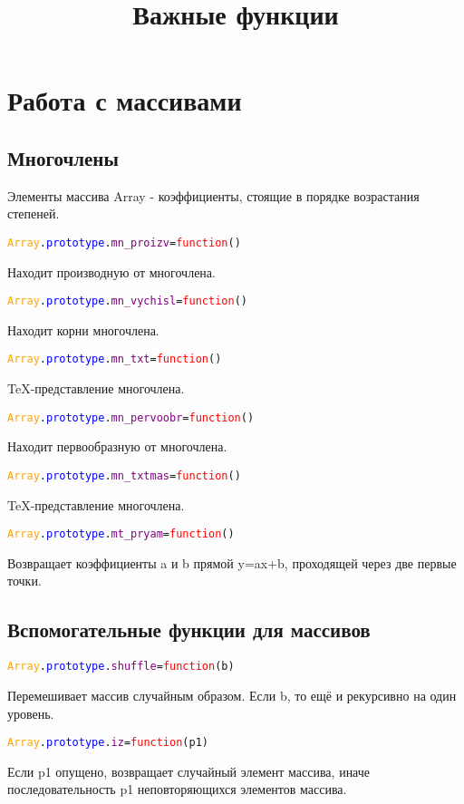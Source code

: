 \documentclass[a4paper,12pt]{article}
\begin{document}
	
	\title{Важные функции}
	\section{Работа с массивами}
	\subsection{Многочлены}
	Элементы массива Array - коэффициенты, стоящие в порядке возрастания степеней.
	\begin{alltt}
		\textcolor{Orange}{Array}.\textcolor{Blue}{prototype}.\textcolor{Purple}{mn_proizv}=\textcolor{Red}{function}()
	\end{alltt}
	Находит производную от многочлена. 
	\begin{alltt}
		\textcolor{Orange}{Array}.\textcolor{Blue}{prototype}.\textcolor{Purple}{mn_vychisl}=\textcolor{Red}{function}()
	\end{alltt}
	Находит корни многочлена.
	\begin{alltt}
		\textcolor{Orange}{Array}.\textcolor{Blue}{prototype}.\textcolor{Purple}{mn_txt}=\textcolor{Red}{function}()
	\end{alltt}
	TeX-представление многочлена.%
	\begin{alltt}
		\textcolor{Orange}{Array}.\textcolor{Blue}{prototype}.\textcolor{Purple}{mn_pervoobr}=\textcolor{Red}{function}()
	\end{alltt}
	Находит первообразную от многочлена.%
	\begin{alltt}
		\textcolor{Orange}{Array}.\textcolor{Blue}{prototype}.\textcolor{Purple}{mn_txtmas}=\textcolor{Red}{function}()
	\end{alltt}
	TeX-представление многочлена.
	\begin{alltt}
		\textcolor{Orange}{Array}.\textcolor{Blue}{prototype}.\textcolor{Purple}{mt_pryam}=\textcolor{Red}{function}()
	\end{alltt}
	Возвращает коэффициенты a и b прямой y=ax+b, проходящей через две первые точки.
	\subsection{Вспомогательные функции для массивов}
	\begin{alltt}
		\textcolor{Orange}{Array}.\textcolor{Blue}{prototype}.\textcolor{Purple}{shuffle}=\textcolor{Red}{function}(b)
	\end{alltt}	
	Перемешивает массив случайным образом. Если b, то ещё и рекурсивно на один уровень.
	\begin{alltt}
		\textcolor{Orange}{Array}.\textcolor{Blue}{prototype}.\textcolor{Purple}{iz}=\textcolor{Red}{function}(p1)
	\end{alltt}
	Если p1 опущено, возвращает случайный элемент массива, иначе последовательность p1 неповторяющихся элементов массива.
\end{document}
